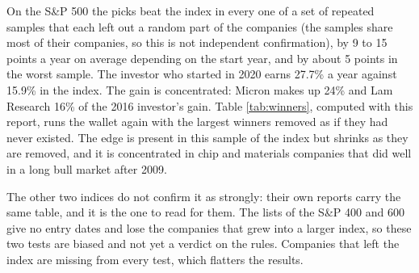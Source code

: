 \documentclass[11pt,a4paper]{article}
\begin{document}
On the S\&P 500 the picks beat the index in every one of a set of repeated samples that each left out a random part of the companies (the samples share most of their companies, so this is not independent confirmation), by 9 to 15 points a year on average depending on the start year, and by about 5 points in the worst sample. The investor who started in 2020 earns 27.7\% a year against 15.9\% in the index. The gain is concentrated: Micron makes up 24\% and Lam Research 16\% of the 2016 investor's gain. Table \ref{tab:winners}, computed with this report, runs the wallet again with the largest winners removed as if they had never existed. The edge is present in this sample of the index but shrinks as they are removed, and it is concentrated in chip and materials companies that did well in a long bull market after 2009.

The other two indices do not confirm it as strongly: their own reports carry the same table, and it is the one to read for them. The lists of the S\&P 400 and 600 give no entry dates and lose the companies that grew into a larger index, so these two tests are biased and not yet a verdict on the rules. Companies that left the index are missing from every test, which flatters the results.
\end{document}

